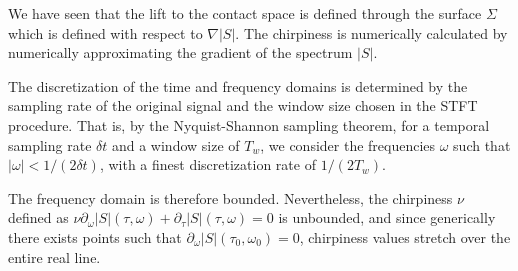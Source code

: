 \documentclass[american,]{article}
\theoremstyle{definition}
\theoremstyle{definition}
\theoremstyle{definition}
\theoremstyle{remark}
\begin{document}
We have seen that the lift to the contact space is defined through
the surface \(\Sigma\) which is defined with respect to \(\nabla\left\lvert S\right\rvert\).
The chirpiness is numerically calculated by numerically approximating
the gradient of the spectrum \(\left\lvert S\right\rvert\).

The discretization of the time and frequency domains is determined by
the sampling rate of the original signal and the window size
chosen in the STFT procedure.
That is, by the Nyquist-Shannon sampling theorem,
for a temporal sampling rate \(\delta t\) and a window size of \(T_w\),
we consider the frequencies \(\omega\) such that \(|\omega|<1/(2\delta t)\),
with a finest discretization rate of \(1/(2T_w)\).

The frequency domain is therefore bounded.
Nevertheless, the chirpiness \(\nu\) defined as
\(\nu\partial_\omega\left\lvert S\right\rvert(\tau,\omega) + \partial_\tau\left\lvert S\right\rvert(\tau,\omega)=0\) is unbounded,
and since generically there exists points such that
\(\partial_\omega\left\lvert S\right\rvert(\tau_0,\omega_0)=0\),
chirpiness values stretch over the entire real line.
\end{document}
